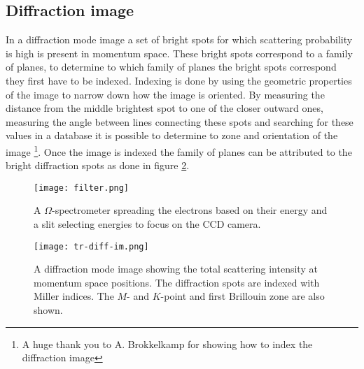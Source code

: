 \subsection{Diffraction image}
In a diffraction mode image a set of bright spots for which scattering probability is high is present in momentum space. These bright spots correspond to a family of planes, to determine to which family of planes the bright spots correspond they first have to be indexed. Indexing is done by using the geometric properties of the image to narrow down how the image is oriented.
By measuring the distance from the middle brightest spot to one of the closer outward ones, measuring the angle between lines connecting these spots and searching for these values in a database it is possible to determine to zone and orientation of the image \footnote{A huge thank you to A. Brokkelkamp for showing how to index the diffraction image}. Once the image is indexed the family of planes can be attributed to the bright diffraction spots as done in figure \ref{fig:tr-diff-im}.

\begin{figure}
	\centering
	\texttt{[image: filter.png]}
	\caption{A $\Omega$-spectrometer spreading the electrons based on their energy and a slit selecting energies to focus on the CCD camera.}
	\label{fig:filter}
\end{figure}
\begin{figure}
	\centering
	\texttt{[image: tr-diff-im.png]}
	\caption{A diffraction mode image showing the total scattering intensity at momentum space positions. The diffraction spots are indexed with Miller indices. The $M$- and $K$-point and first Brillouin zone are also shown.}
	\label{fig:tr-diff-im}
\end{figure}

